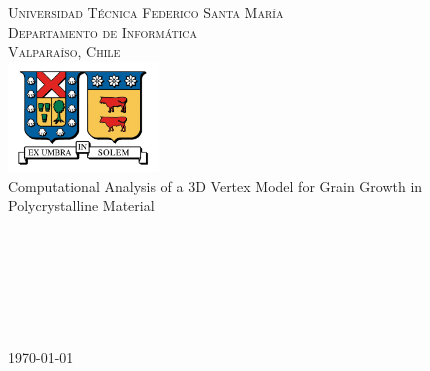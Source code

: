 \begin{titlepage}

\begin{center}

\textsc{\Large Universidad Técnica Federico Santa María}\\
\textsc{\large Departamento de Informática}\\
\textsc{\large Valparaíso, Chile}\\[1.5cm]

\includegraphics[width=0.3\textwidth]{figures/utfsm.jpg}\\[1cm]    

{\huge Computational Analysis of a 3D Vertex Model for Grain Growth in Polycrystalline Material} \\[2cm]

\\[2cm]
 \\ \\[3cm]
\\
\\
\\

\vfill

{\large \today}

\end{center}

\end{titlepage}
